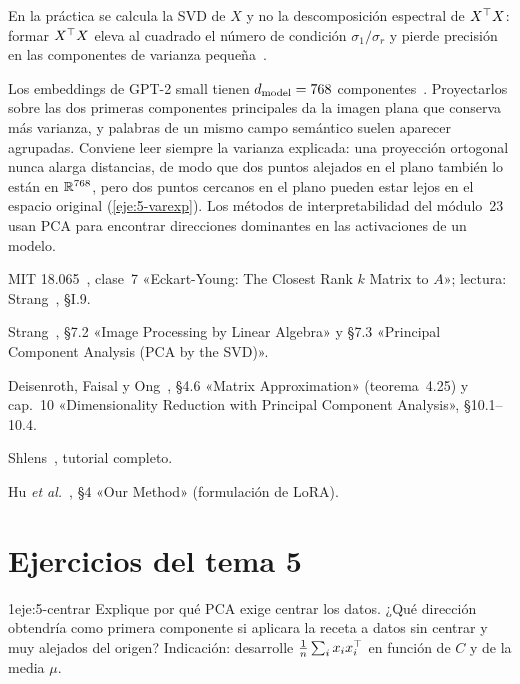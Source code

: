 \begin{observacion}
En la práctica se calcula la SVD de $X$ y no la descomposición espectral de $X^{\top} X$: formar $X^{\top} X$ eleva al cuadrado el número de condición $\sigma_1/\sigma_r$ y pierde precisión en las componentes de varianza pequeña~\cite[§10.4]{mml}.
\end{observacion}

\begin{observacion}
Los embeddings de GPT-2 small tienen $d_{\mathrm{model}}=768$ componentes~\cite{gpt2}. Proyectarlos sobre las dos primeras componentes principales da la imagen plana que conserva más varianza, y palabras de un mismo campo semántico suelen aparecer agrupadas. Conviene leer siempre la varianza explicada: una proyección ortogonal nunca alarga distancias, de modo que dos puntos alejados en el plano también lo están en $\mathbb{R}^{768}$, pero dos puntos cercanos en el plano pueden estar lejos en el espacio original (\cref{eje:5-varexp}). Los métodos de interpretabilidad del módulo~23 usan PCA para encontrar direcciones dominantes en las activaciones de un modelo.
\end{observacion}

\begin{lecturas}
\item MIT 18.065~\cite{mit18065}, clase~7 «Eckart-Young: The Closest Rank $k$ Matrix to $A$»; lectura: Strang~\cite{strang-lafd}, §I.9.
\item Strang~\cite{strang-ila}, §7.2 «Image Processing by Linear Algebra» y §7.3 «Principal Component Analysis (PCA by the SVD)».
\item Deisenroth, Faisal y Ong~\cite{mml}, §4.6 «Matrix Approximation» (teorema~4.25) y cap.~10 «Dimensionality Reduction with Principal Component Analysis», §10.1--10.4.
\item Shlens~\cite{shlens}, tutorial completo.
\item Hu \emph{et al.}~\cite{hu-lora}, §4 «Our Method» (formulación de LoRA).
\end{lecturas}

\section*{Ejercicios del tema 5}

\begin{ejercicio}{1}{eje:5-centrar}
Explique por qué PCA exige centrar los datos. ¿Qué dirección obtendría como primera componente si aplicara la receta a datos sin centrar y muy alejados del origen? Indicación: desarrolle $\frac1n\sum_ix_ix_i^{\top}$ en función de $C$ y de la media $\mu$.
\end{ejercicio}

